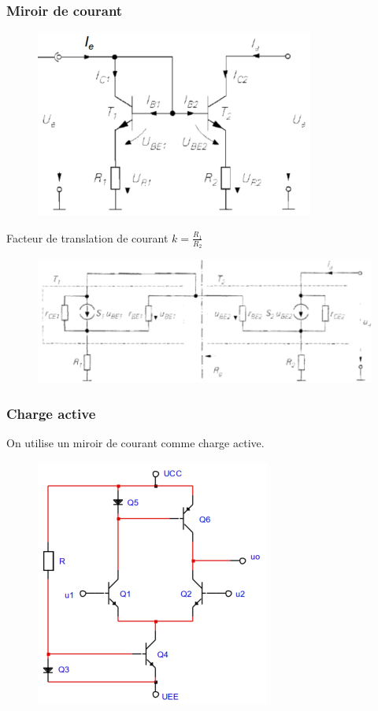 \documentclass[resume]{subfiles}
\begin{document}
\begin{multicols}{3}
\subsubsection{Miroir de courant}
\begin{figure}[H]
    \centering
    \includegraphics[width=0.6\columnwidth]{../images/OpAmp1/m_mirroir.png}
\end{figure}
Facteur de translation de courant $k = \frac{R_1}{R_2}$
\begin{figure}[H]
    \centering
    \includegraphics[width=0.9\columnwidth]{../images/OpAmp1/mPS_mirroir.png}
\end{figure}

\subsubsection{Charge active}
On utilise un miroir de courant comme charge active.
\begin{figure}[H]
    \centering
    \includegraphics[width=0.5\columnwidth]{../images/OpAmp1/m_chrgact.png}
\end{figure}


\end{multicols}
\end{document}
